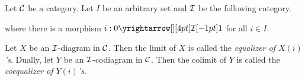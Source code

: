 \begin{eg}
  
\end{eg}

\begin{eg}
  
\end{eg}

\begin{eg}[Products]
  
\end{eg}

\begin{eg}[Coproducts]
  
\end{eg}

\begin{dfn}[(Co)Equalizers]
  
  Let $\mathcal{C}$ be a category. 
  Let $I$ be an arbitrary set and $\mathcal{I}$ be the following category. 
  \begin{figure}[H]
    \centering
  \end{figure}
  where there is a morphism $i : \map{0}{1}{\II}{}$ for all $i \in I$. 

  Let $X$ be an $\mathcal{I}$-diagram in $\mathcal{C}$. 
  Then the limit of $X$ is called 
  the \emph{equalizer of $X(i)$'s}. 
  Dually, let $Y$ be an $\mathcal{I}$-codiagram in $\mathcal{C}$. 
  Then the colimit of $Y$ is called the 
  \emph{coequalizer of $Y(i)$'s}.
\end{dfn}

\begin{eg}[Equalizers]
  
\end{eg}

\begin{eg}[Coequalizers]
  
\end{eg}

